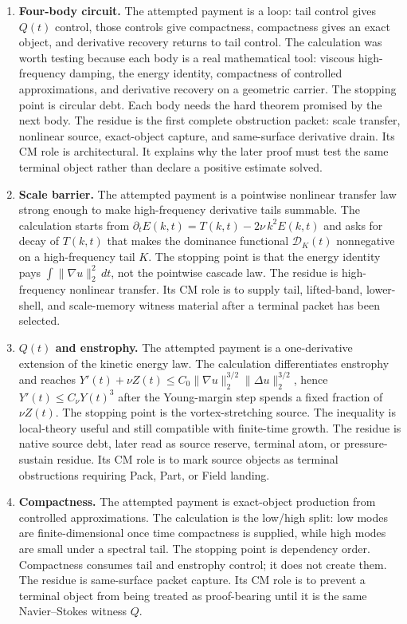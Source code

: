 \begin{enumerate}[leftmargin=*,label=\arabic*.]
\item \textbf{Four-body circuit.}
The attempted payment is a loop:
tail control gives \(Q(t)\) control, those controls give compactness, compactness
gives an exact object, and derivative recovery returns to tail control.
The calculation was worth testing because each body is a real mathematical tool:
viscous high-frequency damping, the energy identity, compactness of controlled
approximations, and derivative recovery on a geometric carrier.
The stopping point is circular debt.
Each body needs the hard theorem promised by the next body.
The residue is the first complete obstruction packet: scale transfer, nonlinear
source, exact-object capture, and same-surface derivative drain.
Its CM role is architectural.
It explains why the later proof must test the same terminal object rather than
declare a positive estimate solved.

\item \textbf{Scale barrier.}
The attempted payment is a pointwise nonlinear transfer law strong enough to
make high-frequency derivative tails summable.
The calculation starts from
\(\partial_tE(k,t)=T(k,t)-2\nu\,k^2E(k,t)\) and asks for decay of \(T(k,t)\)
that makes the dominance functional \(\mathcal D_K(t)\) nonnegative on a
high-frequency tail \(K\).
The stopping point is that the energy identity pays
\(\int\|\nabla u\|_2^2\,dt\), not the pointwise cascade law.
The residue is high-frequency nonlinear transfer.
Its CM role is to supply tail, lifted-band, lower-shell, and scale-memory
witness material after a terminal packet has been selected.

\item \textbf{\(Q(t)\) and enstrophy.}
The attempted payment is a one-derivative extension of the kinetic energy law.
The calculation differentiates enstrophy and reaches
\(Y'(t)+\nu Z(t)\le C_0\|\nabla u\|_2^{3/2}\|\Delta u\|_2^{3/2}\), hence
\(Y'(t)\le C_\nu Y(t)^3\) after the Young-margin step spends a fixed fraction of \(\nu Z(t)\).
The stopping point is the vortex-stretching source.
The inequality is local-theory useful and still compatible with finite-time
growth.
The residue is native source debt, later read as source reserve, terminal atom,
or pressure-sustain residue.
Its CM role is to mark source objects as terminal obstructions requiring Pack,
Part, or Field landing.

\item \textbf{Compactness.}
The attempted payment is exact-object production from controlled
approximations.
The calculation is the low/high split: low modes are finite-dimensional once
time compactness is supplied, while high modes are small under a spectral tail.
The stopping point is dependency order.
Compactness consumes tail and enstrophy control; it does not create them.
The residue is same-surface packet capture.
Its CM role is to prevent a terminal object from being treated as proof-bearing
until it is the same Navier--Stokes witness \(Q\).


\end{enumerate}
